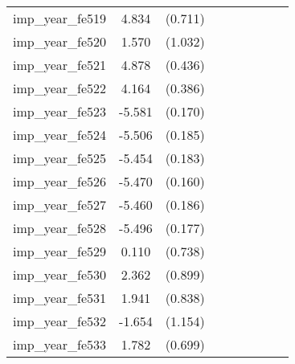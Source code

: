 {\begin{tabular}{l*{4}{cc}}
imp\_year\_fe519&    4.834\sym{***}&  (0.711)&                  &         &                  &         &                  &         \\
imp\_year\_fe520&    1.570         &  (1.032)&                  &         &                  &         &                  &         \\
imp\_year\_fe521&    4.878\sym{***}&  (0.436)&                  &         &                  &         &                  &         \\
imp\_year\_fe522&    4.164\sym{***}&  (0.386)&                  &         &                  &         &                  &         \\
imp\_year\_fe523&   -5.581\sym{***}&  (0.170)&                  &         &                  &         &                  &         \\
imp\_year\_fe524&   -5.506\sym{***}&  (0.185)&                  &         &                  &         &                  &         \\
imp\_year\_fe525&   -5.454\sym{***}&  (0.183)&                  &         &                  &         &                  &         \\
imp\_year\_fe526&   -5.470\sym{***}&  (0.160)&                  &         &                  &         &                  &         \\
imp\_year\_fe527&   -5.460\sym{***}&  (0.186)&                  &         &                  &         &                  &         \\
imp\_year\_fe528&   -5.496\sym{***}&  (0.177)&                  &         &                  &         &                  &         \\
imp\_year\_fe529&    0.110         &  (0.738)&                  &         &                  &         &                  &         \\
imp\_year\_fe530&    2.362\sym{**} &  (0.899)&                  &         &                  &         &                  &         \\
imp\_year\_fe531&    1.941\sym{*}  &  (0.838)&                  &         &                  &         &                  &         \\
imp\_year\_fe532&   -1.654         &  (1.154)&                  &         &                  &         &                  &         \\
imp\_year\_fe533&    1.782\sym{*}  &  (0.699)&                  &         &                  &         &                  &         \\

\end{tabular}}
